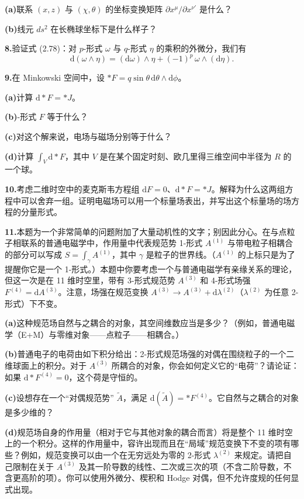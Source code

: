 \textbf{(a)}\quad 联系 $(x,z)$ 与 $(\chi,\theta)$ 的坐标变换矩阵 $\partial x^{\mu}/\partial x^{\nu'}$ 是什么？

\textbf{(b)}\quad 线元 $ds^{2}$ 在长椭球坐标下是什么样子？

\textbf{8.}\quad 验证式 (2.78)：对 $p$-形式 $\omega$ 与 $q$-形式 $\eta$ 的乘积的外微分，我们有
\begin{equation*}
\mathrm{d}(\omega\wedge\eta)=(\mathrm{d}\omega)\wedge\eta+(-1)^{p}\,\omega\wedge(\mathrm{d}\eta). \tag{2.102}
\end{equation*}

\textbf{9.}\quad 在 Minkowski 空间中，设 $*F=q\sin\theta\,\mathrm{d}\theta\wedge\mathrm{d}\phi$。

\textbf{(a)}\quad 计算 $\mathrm{d}*F=*J$。

\textbf{(b)}-形式 $F$ 等于什么？

\textbf{(c)}\quad 对这个解来说，电场与磁场分别等于什么？

\textbf{(d)}\quad 计算 $\int_{V}\mathrm{d}*F$，其中 $V$ 是在某个固定时刻、欧几里得三维空间中半径为 $R$ 的一个球。

\textbf{10.}\quad 考虑二维时空中的麦克斯韦方程组 $\mathrm{d}F=0$、$\mathrm{d}*F=*J$。解释为什么这两组方程中可以舍弃一组。证明电磁场可以用一个标量场表出，并写出这个标量场的场方程的分量形式。

\textbf{11.}\quad 本题为一个非常简单的问题附加了大量动机性的文字；别因此分心。在与点粒子相联系的普通电磁学中，作用量中代表规范势 1-形式 $A^{(1)}$ 与带电粒子相耦合的部分可以写成 $S=\int_{\gamma}A^{(1)}$，其中 $\gamma$ 是粒子的世界线。（$A^{(1)}$ 的上标只是为了提醒你它是一个 1-形式。）本题中你要考虑一个与普通电磁学有亲缘关系的理论，但这一次是在 11 维时空里，带有 3-形式规范势 $A^{(3)}$ 和 4-形式场强 $F^{(4)}=\mathrm{d}A^{(3)}$。注意，场强在规范变换 $A^{(3)}\to A^{(3)}+\mathrm{d}\lambda^{(2)}$（$\lambda^{(2)}$ 为任意 2-形式）下不变。

\textbf{(a)}\quad 这种规范场自然与之耦合的对象，其空间维数应当是多少？（例如，普通电磁学（E+M）与零维对象——点粒子——相耦合。）

\textbf{(b)}\quad 普通电子的电荷由如下积分给出：2-形式规范场强的对偶在围绕粒子的一个二维球面上的积分。对于 $A^{(3)}$ 所耦合的对象，你会如何定义它的“电荷”？请论证：如果 $\mathrm{d}*F^{(4)}=0$，这个荷是守恒的。

\textbf{(c)}\quad 设想存在一个“对偶规范势” $\widetilde{A}$，满足 $\mathrm{d}(\widetilde{A})=*F^{(4)}$。它自然与之耦合的对象是多少维的？

\textbf{(d)}\quad 规范场自身的作用量（相对于它与其他对象的耦合而言）将是整个 11 维时空上的一个积分。这样的作用量中，容许出现而且在“局域”规范变换下不变的项有哪些？例如，规范变换可以由一个在无穷远处为零的 2-形式 $\lambda^{(2)}$ 来规定。请把自己限制在关于 $A^{(3)}$ 及其一阶导数的线性、二次或三次的项（不含二阶导数，不含更高阶的项）。你可以使用外微分、楔积和 Hodge 对偶，但不允许度规的任何显式出现。

